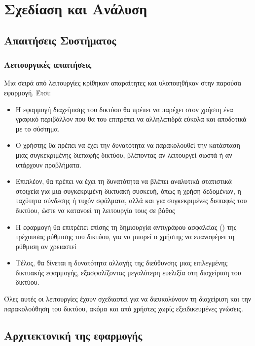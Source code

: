 \chapter{Σχεδίαση και Ανάλυση}

\section{Απαιτήσεις Συστήματος}




\subsection{Λειτουργικές απαιτήσεις}

Μια σειρά από λειτουργίες κρίθηκαν απαραίτητες και υλοποιηθήκαν στην παρούσα εφαρμογή. Έτσι:

\begin{itemize}
    \item Η εφαρμογή διαχείρισης του δικτύου θα πρέπει να  παρέχει στον χρήστη ένα γραφικό περιβάλλον που θα του επιτρέπει να αλληλεπιδρά εύκολα και αποδοτικά με το σύστημα. 
    \item Ο χρήστης θα πρέπει να έχει την δυνατότητα να παρακολουθεί την κατάσταση μιας συγκεκριμένης διεπαφής δικτύου, βλέποντας αν λειτουργεί σωστά ή αν υπάρχουν προβλήματα. 
    \item Επιπλέον, θα πρέπει να έχει τη δυνατότητα να βλέπει αναλυτικά στατιστικά στοιχεία για μια συγκεκριμένη δικτυακή συσκευή, όπως η χρήση δεδομένων, η ταχύτητα σύνδεσης ή τυχόν σφάλματα, αλλά και για συγκεκριμένες διεπαφές του δικτύου, ώστε να κατανοεί τη λειτουργία τους σε βάθος
    \item Η εφαρμογή θα επιτρέπει επίσης τη δημιουργία αντιγράφου ασφαλείας () της τρέχουσας ρύθμισης του δικτύου, για να μπορεί ο χρήστης να επαναφέρει τη ρύθμιση αν χρειαστεί
    \item Τέλος, θα δίνεται η δυνατότητα αλλαγής της διεύθυνσης  μιας επιλεγμένης δικτυακής εφαρμογής, εξασφαλίζοντας μεγαλύτερη ευελιξία στη διαχείριση του δικτύου. 
\end{itemize}

Όλες αυτές οι λειτουργίες έχουν σχεδιαστεί για να διευκολύνουν τη διαχείριση και την παρακολούθηση του δικτύου, ακόμα και από χρήστες χωρίς εξειδικευμένες γνώσεις.


\section{Αρχιτεκτονική της εφαρμογής}

